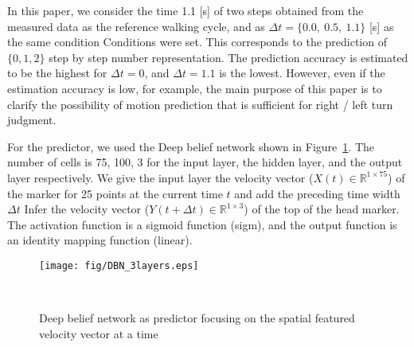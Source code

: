 \documentclass{sigchi}
\begin{document}
In this paper, we consider the time 1.1 [s] of two steps obtained from the measured data as the reference walking cycle, and as $ \Delta t = \{0.0, \ 0.5, \ 1.1 \} $ [s] as the same condition Conditions were set. This corresponds to the prediction of $ \{0, 1, 2\} $ step by step number representation. The prediction accuracy is estimated to be the highest for $ \Delta t = 0 $, and $ \Delta t = 1.1 $ is the lowest. However, even if the estimation accuracy is low, for example, the main purpose of this paper is to clarify the possibility of motion prediction that is sufficient for right / left turn judgment.

For the predictor, we used the Deep belief network shown in Figure~\ref{fig:dbn}. The number of cells is 75, 100, 3 for the input layer, the hidden layer, and the output layer respectively. We give the input layer the velocity vector ($ X (t) \in \mathbb {R}^{1 \times 75} $) of the marker for 25 points at the current time $ t $ and add the preceding time width $ \Delta t $ Infer the velocity vector ($ Y (t + \Delta t) \in \mathbb {R} ^{1 \times 3} $) of the top of the head marker. The activation function is a sigmoid function (sigm), and the output function is an identity mapping function (linear).

\begin{figure}
\centering
\hspace{10mm}\texttt{[image: fig/DBN\_3layers.eps]}\vspace{3mm}
  \caption{Deep belief network as predictor focusing on the spatial featured velocity vector at a time}~\label{fig:dbn}
\end{figure}

\end{document}
